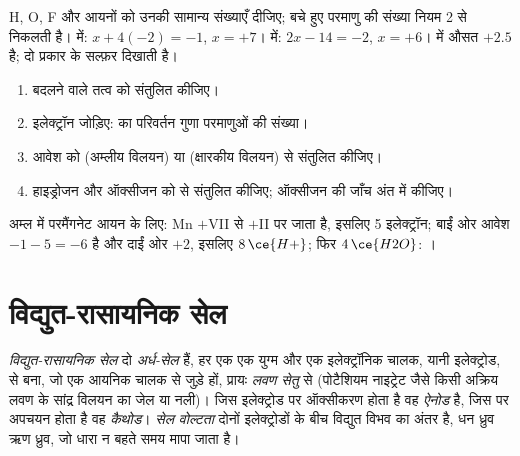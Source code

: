 \begin{method}[किसी स्पीशीज़ की ऑक्सीकरण संख्याएँ]\label{met:b1:nernst:oxidation-numbers}
H, O, F और आयनों को उनकी सामान्य संख्याएँ दीजिए; बचे हुए
परमाणु की संख्या नियम 2 से निकलती है।  में: $x + 4(-2) = -1$, $x = +7$।
 में: $2x - 14 = -2$, $x = +6$।  में औसत
$+2.5$ है;  दो प्रकार के सल्फ़र दिखाती है।
\end{method}

\begin{method}\label{met:b1:nernst:balance-by-on}
\begin{enumerate}
  \item {} बदलने वाले तत्व को संतुलित कीजिए।
  \item इलेक्ट्रॉन जोड़िए:  का परिवर्तन गुणा
        परमाणुओं की संख्या।
  \item आवेश को  (अम्लीय विलयन) या 
        (क्षारकीय विलयन) से संतुलित कीजिए।
  \item हाइड्रोजन और ऑक्सीजन को  से संतुलित कीजिए; ऑक्सीजन की जाँच अंत में कीजिए।
\end{enumerate}
अम्ल में परमैंगनेट आयन के लिए: Mn $+$VII से $+$II पर जाता है, इसलिए 5
इलेक्ट्रॉन; बाईं ओर आवेश $-1 - 5 = -6$ है और दाईं ओर $+2$,
इसलिए $8\,\ce{H+}$; फिर $4\,\ce{H2O}$:
।
\end{method}

\section{विद्युत-रासायनिक सेल}

\begin{definition}[विद्युत-रासायनिक सेल]\label{def:b1:nernst:cell}
\emph{विद्युत-रासायनिक सेल} दो
\emph{अर्ध-सेल} हैं, हर एक एक युग्म और एक
इलेक्ट्रॉनिक चालक, यानी इलेक्ट्रोड, से बना, जो एक आयनिक चालक से जुड़े हों, प्रायः
\emph{लवण सेतु} से (पोटैशियम नाइट्रेट जैसे किसी अक्रिय लवण के
सांद्र विलयन का जेल या नली)। जिस इलेक्ट्रोड पर ऑक्सीकरण
होता है वह \emph{ऐनोड} है, जिस पर अपचयन
होता है वह \emph{कैथोड}। \emph{सेल
वोल्टता} दोनों इलेक्ट्रोडों के बीच विद्युत विभव का
अंतर है, धन ध्रुव ऋण ध्रुव, जो
धारा न बहते समय मापा जाता है।
\end{definition}

